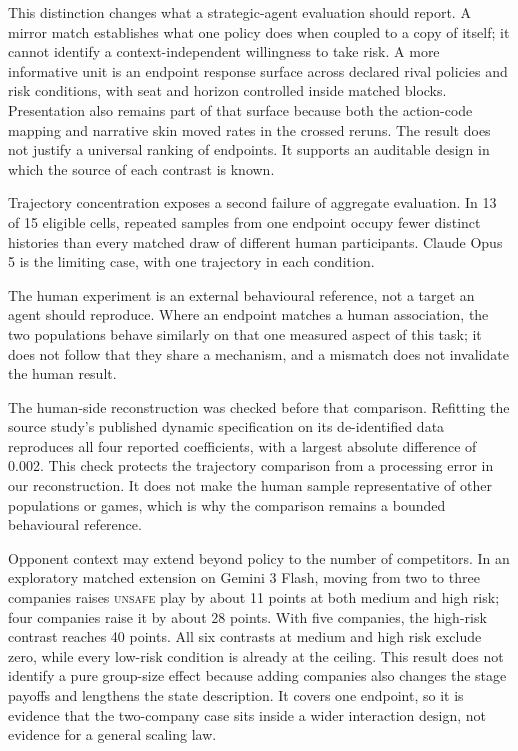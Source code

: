 \documentclass[sigconf,anonymous]{aamas}
\newcommand{\Unsafe}{\textsc{unsafe}}
\begin{document}
This distinction changes what a strategic-agent evaluation should report. A
mirror match establishes what one policy does when coupled to a copy of itself;
it cannot identify a context-independent willingness to take risk. A more
informative unit is an endpoint response surface across declared rival policies
and risk conditions, with seat and horizon controlled inside matched blocks.
Presentation also remains part of that surface because both the action-code
mapping and narrative skin moved rates in the crossed reruns. The result does
not justify a universal ranking of endpoints. It supports an auditable design
in which the source of each contrast is known.

Trajectory concentration exposes a second failure of aggregate evaluation. In
13 of 15 eligible cells, repeated samples from one endpoint occupy fewer
distinct histories than every matched draw of different human participants.
Claude Opus 5 is the limiting case, with one trajectory in each condition.

The human experiment is an external behavioural reference, not a target an
agent should reproduce. Where an endpoint matches a human association, the two
populations behave similarly on that one measured aspect of this task; it
does not follow that they share a mechanism, and a mismatch does not
invalidate the human result.

The human-side reconstruction was checked before that comparison. Refitting
the source study's published dynamic specification on its de-identified data
reproduces all four reported coefficients, with a largest absolute difference
of 0.002. This check protects the trajectory comparison from a processing
error in our reconstruction. It does not make the human sample representative
of other populations or games, which is why the comparison remains a bounded
behavioural reference.

Opponent context may extend beyond policy to the number of competitors. In an
exploratory matched extension on Gemini 3 Flash, moving from two to three
companies raises \Unsafe{} play by about 11 points at both medium and high risk;
four companies raise it by about 28 points. With five companies, the high-risk
contrast reaches 40 points. All six contrasts at medium and high risk exclude
zero, while every low-risk condition is already at the ceiling. This result does
not identify a pure group-size effect because adding companies also changes the
stage payoffs and lengthens the state description. It covers one endpoint, so it
is evidence that the two-company case sits inside a wider interaction design,
not evidence for a general scaling law.
\end{document}
